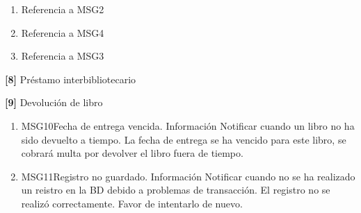 \begin{Citemize}
\begin{enumerate}
			\item Referencia a MSG2
			\item Referencia a MSG4
			\item Referencia a MSG3
		\end{enumerate}
	\item {\bf [8]} Préstamo interbibliotecario
	\item {\bf [9]} Devolución de libro
		\begin{enumerate}
			\item
			\begin{Message}{MSG10}{Fecha de entrega vencida.}
				\MSGitem[Tipo: ] Información
				\MSGitem[Objetivo: ] Notificar cuando un libro no ha sido devuelto a tiempo.
				\MSGitem[Redacción: ] La fecha de entrega se ha vencido para este libro, se cobrará multa por devolver el libro fuera de tiempo.
			\end{Message}
			
			\item
			\begin{Message}{MSG11}{Registro no guardado.}
				\MSGitem[Tipo: ] Información
				\MSGitem[Objetivo: ] Notificar cuando no se ha realizado un reistro en la BD debido a problemas de transacción.
				\MSGitem[Redacción: ] El registro no se realizó correctamente. Favor de intentarlo de nuevo.
			\end{Message}
			

\end{enumerate}
\end{Citemize}
